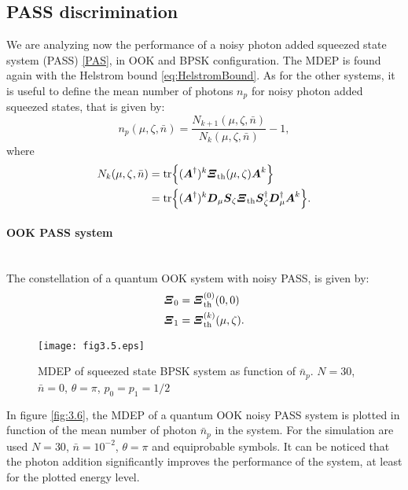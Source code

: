     \subsection{PASS discrimination}
        We are analyzing now the performance of a noisy photon added squeezed state system (PASS)
        \ref{PAS}, in OOK and BPSK configuration. The MDEP is found again with the Helstrom bound
        \ref{eq:HelstromBound}.
        As for the other systems, it is useful to define the mean number of photons $n_p$ for noisy 
        photon added squeezed states, that is given by:
        \begin{equation}
            n_p(\mu,\zeta,\bar{n}) = \frac{N_{k+1}(\mu,\zeta,\bar{n})}{N_k(\mu,\zeta,\bar{n})}-1,
            \label{eq:np_PASS}
        \end{equation}
        where
        \begin{equation}
            \begin{split}
                N_k(\mu,\zeta,\bar{n}) &= \tr{(\Operator{A}^\dagger)^k \Operator{\varXi}_{\mathrm{th}}(\mu,\zeta) \Operator{A}^k}\\
                                       &= \tr{(\Operator{A}^\dagger)^k \Operator{D}_\mu \Operator{S}_\zeta \Operator{\varXi}_{\mathrm{th}}
                                        \Operator{S}_\zeta^\dagger \Operator{D}_\mu^\dagger \Operator{A}^k}.
            \end{split}
        \end{equation}

        \paragraph{OOK PASS system}\mbox{}\\
        The constellation of a quantum OOK system with noisy PASS, is given by:
        \begin{subequations}
            \begin{align}
                \Operator{\varXi}_0 &= \Operator{\varXi}_{\mathrm{th}}^{(0)}(0,0)\\
                \Operator{\varXi}_1 &= \Operator{\varXi}_{\mathrm{th}}^{(k)}(\mu,\zeta).
            \end{align}
        \end{subequations}
        \begin{figure}[t]
            \begin{center}
                \texttt{[image: fig3.5.eps]}
                \caption{MDEP of squeezed state BPSK system as function of $\bar{n}_p$. 
                    $N=30$, $\bar{n}=0$, $\theta=\pi$, $p_0=p_1=1/2$}
                \label{fig:3.5}
            \end{center}     
        \end{figure}
        In figure \ref{fig:3.6}, the MDEP of a quantum OOK noisy PASS system is plotted in function
        of the mean number of photon $\bar{n}_p$ in the system. For the simulation are used $N=30$, $\bar{n}=10^{-2}$, $\theta=\pi$ and
        equiprobable symbols.
        It can be noticed that the photon addition significantly improves the performance of the system,
        at least for the plotted energy level.

